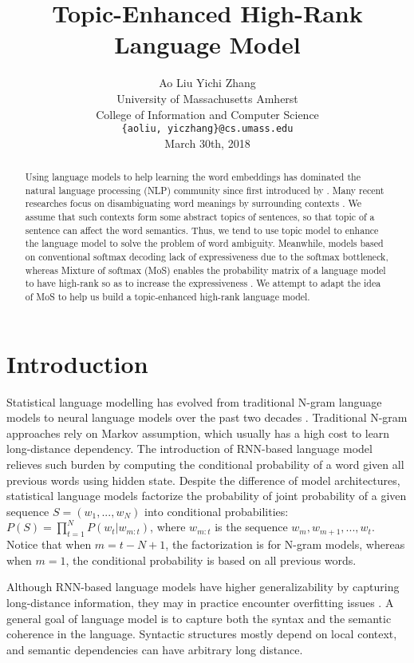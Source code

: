 \documentclass[11pt,a4paper]{article}
\title{Topic-Enhanced High-Rank Language Model}
\author{Ao Liu \hspace{2cm} Yichi Zhang\\
  University of Massachusetts Amherst\\
  College of Information and Computer Science\\
  {\tt \{aoliu, yiczhang\}@cs.umass.edu}\\
  March 30th, 2018}
\begin{document}
\maketitle
\begin{abstract}
  Using language models to help learning the word embeddings has dominated the natural language processing (NLP) community since first introduced by \citet{bengio2003neural}.  Many recent researches focus on disambiguating word meanings by surrounding contexts \citep{mccann2017learned, peters2018deep}. We assume that such contexts form some abstract topics of sentences, so that topic of a sentence can affect the word semantics. Thus, we tend to use topic model to enhance the language model to solve the problem of word ambiguity. Meanwhile, models based on conventional softmax decoding lack of expressiveness due to the softmax bottleneck, whereas Mixture of softmax (MoS) enables the probability matrix of a language model to have high-rank so as to increase the expressiveness \citep{yang2017breaking}. We attempt to adapt the idea of MoS to help us build a topic-enhanced high-rank language model.
\end{abstract}

\section{Introduction}
\label{sec:intro}
Statistical language modelling has evolved from traditional N-gram language models to neural language models over the past two decades \citep{bengio2003neural, mikolov2010recurrent}. Traditional N-gram approaches rely on Markov assumption, which usually has a high cost to learn long-distance dependency. The introduction of RNN-based language model relieves such burden by computing the conditional probability of a word given all previous words using hidden state\citep{mikolov2010recurrent}. Despite the difference of model architectures, statistical language models factorize the probability of joint probability of a given sequence $S = (w_1, ..., w_N)$ into conditional probabilities: $P(S) = \prod\limits_{t=1}^N P(w_t | w_{m:t})$, where $w_{m:t}$ is the sequence $w_m, w_{m + 1}, ..., w_t$. Notice that when $m = t - N + 1$, the factorization is for N-gram models, whereas when $m = 1$, the conditional probability is based on all previous words.

Although RNN-based language models have higher generalizability by capturing long-distance information, they may in practice encounter overfitting issues \citep{srivastava2014dropout}. A general goal of language model is to capture both the syntax and the semantic coherence in the language. Syntactic structures mostly depend on local context, and semantic dependencies can have arbitrary long distance.
\end{document}
